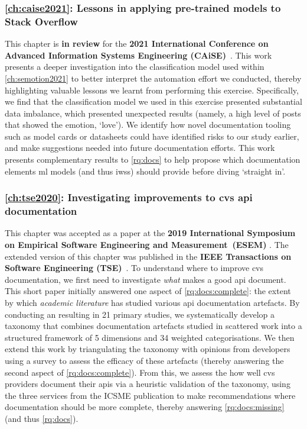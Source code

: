 \subsubsection{\cref{ch:caise2021}: Lessons in applying pre-trained models to Stack Overflow} This chapter is \textbf{in review} for the \textbf{2021 International Conference on Advanced Information Systems Engineering (CAiSE)}~\citep{Graetsch:2021caise}. This work presents a deeper investigation into the classification model used within \cref{ch:semotion2021} to better interpret the automation effort we conducted, thereby highlighting valuable lessons we learnt from performing this exercise. Specifically, we find that the classification model we used in this exercise presented substantial data imbalance, which presented unexpected results (namely, a high level of posts that showed the emotion, `love'). We identify how novel documentation tooling such as model cards \citep{Mitchell:2018in} or datasheets \citep{Gebru:2018wh} could have identified risks to our study earlier, and make suggestions needed into future documentation efforts. This work presents complementary  results to \ref{rq:docs} to help propose which documentation elements \gls{ml} models (and thus \glspl{iws}) should provide before diving `straight in'.

\subsubsection{\cref{ch:tse2020}: Investigating improvements to \gls{cvs} \gls{api} documentation} This chapter was accepted as a paper at the \textbf{2019 International Symposium on Empirical Software Engineering and Measurement~(ESEM)} \citep{Cummaudo:2020icse}. The extended version of this chapter was published in the \textbf{IEEE Transactions on Software Engineering (TSE)}~\citep{Cummaudo:2020tse}. To understand where to improve \gls{cvs} documentation, we first need to investigate \textit{what} makes a good \gls{api} document. This short paper initially answered one aspect of \ref{rq:docs:complete}: the extent by which \textit{academic literature} has studied various \gls{api} documentation artefacts. By conducting an  resulting in 21 primary studies, we systematically develop a taxonomy that combines documentation artefacts studied in scattered work into a structured framework of 5 dimensions and 34 weighted categorisations. We then extend this work by triangulating the taxonomy with opinions from developers using a survey to assess the efficacy of these artefacts (thereby answering the second aspect of \ref{rq:docs:complete}). From this, we assess the how well \gls{cvs} providers document their \glspl{api} via a heuristic validation of the taxonomy, using the three services from the ICSME publication to make recommendations where documentation should be more complete, thereby answering \ref{rq:docs:missing} (and thus \ref{rq:docs}).

